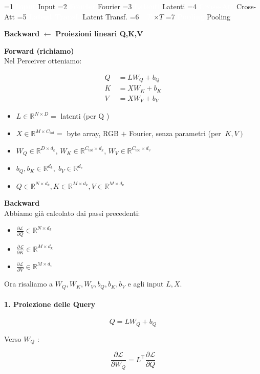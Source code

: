 \documentclass[
  11pt,
]{article}
\newcommand{\currentstep}[1]{%
\begin{tcolorbox}[colback=red!3, colframe=red!40!black, boxrule=0.3pt, arc=2pt,
  left=4pt, right=4pt, top=2pt, bottom=2pt]
{\footnotesize\textbf{Backward} $\longleftarrow$ \textbf{#1}}
\end{tcolorbox}}
\newcommand{\mystripchip}[3]{%
  \setlength{\fboxsep}{2.8pt}%
  \ifnum#3=#1\relax
    \colorbox{seccolor}{\textcolor{white}{\bfseries #2}}%
  \else
    \colorbox{seccolor!8}{\textcolor{seccolor!55}{#2}}%
  \fi}
\newcommand{\mystriparr}{{\fontsize{8}{8}\selectfont\;\textcolor{seccolor!45}{$\rightarrow$}\;}}
\newcommand{\mystrip}[1]{%
\begin{center}
{\sffamily\fontsize{7.5}{9}\selectfont
\mystripchip{1}{Input}{#1}\mystriparr\mystripchip{2}{Fourier}{#1}\mystriparr\mystripchip{3}{Latenti}{#1}\mystriparr%
\mystripchip{4}{Cross-Att}{#1}\mystriparr\mystripchip{5}{Latent Transf.}{#1}\mystriparr%
\mystripchip{6}{$\times T$}{#1}\mystriparr\mystripchip{7}{Pooling}{#1}}
\end{center}}
\renewcommand{\currentstep}[2][0]{%
\mystrip{#1}%
\begin{tcolorbox}[colback=red!3, colframe=red!40!black, boxrule=0.3pt, arc=2pt,
  left=4pt, right=4pt, top=2pt, bottom=2pt]
{\footnotesize\textbf{Backward} $\longleftarrow$ \textbf{#2}}
\end{tcolorbox}}
\begin{document}
\currentstep[5]{Proiezioni lineari Q,K,V}

\textbf{Forward (richiamo)}\\
Nel Perceiver otteniamo:

\[\begin{matrix}
Q & \  = LW_{Q} + b_{Q} \\
K & \  = XW_{K} + b_{K} \\
V & \  = XW_{V} + b_{V}
\end{matrix}\]

\begin{itemize}
\item
  \(L \in \mathbb{R}^{N \times D} =\) latenti (per Q )
\item
  \(X \in \mathbb{R}^{M \times C_{\text{tot}}} =\) byte array, RGB $+$ Fourier, senza parametri (per
  \(\left. \ K,V \right)\)
\item
  \(W_{Q} \in \mathbb{R}^{D \times d_{k}}\), \(W_{K} \in \mathbb{R}^{C_{\text{tot}} \times d_{k}}\), \(W_{V} \in \mathbb{R}^{C_{\text{tot}} \times d_{v}}\)
\item
  \(b_{Q},b_{K} \in \mathbb{R}^{d_{k}},\; b_{V} \in \mathbb{R}^{d_{v}}\)
\item
  \(Q \in \mathbb{R}^{N \times d_{k}},K \in \mathbb{R}^{M \times d_{k}},V \in \mathbb{R}^{M \times d_{v}}\)
\end{itemize}

\textbf{Backward}\\
Abbiamo già calcolato dai passi precedenti:

\begin{itemize}
\item
  \(\frac{\partial\mathcal{L}}{\partial Q} \in \mathbb{R}^{N \times d_{k}}\)
\item
  \(\frac{\partial\mathcal{L}}{\partial K} \in \mathbb{R}^{M \times d_{k}}\)
\item
  \(\frac{\partial\mathcal{L}}{\partial V} \in \mathbb{R}^{M \times d_{v}}\)
\end{itemize}

Ora risaliamo a \(W_{Q},W_{K},W_{V},b_{Q},b_{K},b_{V}\) e agli input
\(L,X\).

\paragraph{1. Proiezione delle Query}

\[Q = LW_{Q} + b_{Q}\]

Verso \(W_{Q}\) :

\[\frac{\partial\mathcal{L}}{\partial W_{Q}} = L^{\top}\frac{\partial\mathcal{L}}{\partial Q}\]
\end{document}
